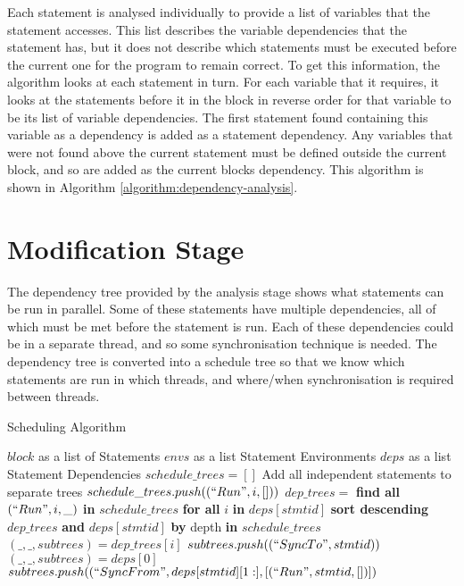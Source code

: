 Each statement is analysed individually to provide a list of variables that the statement accesses. This list describes the variable dependencies that the statement has, but it does not describe which statements must be executed before the current one for the program to remain correct. To get this information, the algorithm looks at each statement in turn. For each variable that it requires, it looks at the statements before it in the block in reverse order for that variable to be its list of variable dependencies. The first statement found containing this variable as a dependency is added as a statement dependency. Any variables that were not found above the current statement must be defined outside the current block, and so are added as the current blocks dependency. This algorithm is shown in Algorithm \autoref{algorithm:dependency-analysis}.


\section{Modification Stage}
The dependency tree provided by the analysis stage shows what statements can be run in parallel. Some of these statements have multiple dependencies, all of which must be met before the statement is run. Each of these dependencies could be in a separate thread, and so some synchronisation technique is needed. The dependency tree is converted into a schedule tree so that we know which statements are run in which threads, and where/when synchronisation is required between threads.

\begin{algorithm}[H]
\caption{Scheduling Algorithm}
\label{algorithm:scheduling}
\begin{algorithmic}[1]
    \Require $block$ as a list of Statements
    \Require $envs$ as a list Statement Environments
    \Require $deps$ as a list Statement Dependencies
    \State $schedule\_trees = []$
     \Comment Add all independent statements to separate trees
            \State $schedule\_trees.push((``Run", i, []))$
        \EndIf
    \EndFor
                \State $dep\_trees =$ \textbf{find all} $(``Run", i, \_)$ \textbf{in} $schedule\_trees$ \textbf{for all} $i$ \textbf{in} $deps[stmtid]$
                \State \textbf{sort descending} $dep\_trees$ \textbf{and} $deps[stmtid]$ \textbf{by} depth \textbf{in} $schedule\_trees$
                    \State $(\_,\_,subtrees) = dep\_trees[i]$
                    \State $subtrees.push((``SyncTo", stmtid))$
                \EndFor
                \State $(\_,\_,subtrees) = deps[0]$
                \State $subtrees.push((``SyncFrom", deps[stmtid][1:], [(``Run", stmtid, [])])$
            \EndIf
        \EndFor
    \EndWhile
\end{algorithmic}
\end{algorithm}

